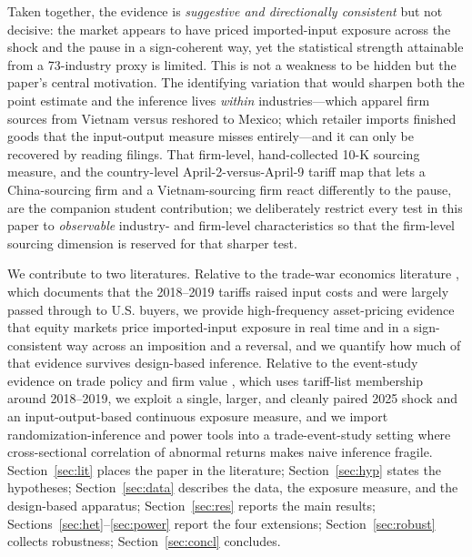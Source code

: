 \documentclass[12pt]{article}
\begin{document}
Taken together, the evidence is \emph{suggestive and directionally consistent} but not
decisive: the market appears to have priced imported-input exposure across the shock and the
pause in a sign-coherent way, yet the statistical strength attainable from a 73-industry proxy
is limited. This is not a weakness to be hidden but the paper's central motivation. The
identifying variation that would sharpen both the point estimate and the inference lives
\emph{within} industries---which apparel firm sources from Vietnam versus reshored to Mexico;
which retailer imports finished goods that the input-output measure misses entirely---and it
can only be recovered by reading filings. That firm-level, hand-collected 10-K sourcing
measure, and the country-level April-2-versus-April-9 tariff map that lets a China-sourcing
firm and a Vietnam-sourcing firm react differently to the pause, are the companion student
contribution; we deliberately restrict every test in this paper to \emph{observable}
industry- and firm-level characteristics so that the firm-level sourcing dimension is reserved
for that sharper test.

We contribute to two literatures. Relative to the trade-war economics literature
\citep{amiti2019,fajgelbaum2020,handley2017}, which documents that the 2018--2019 tariffs
raised input costs and were largely passed through to U.S. buyers, we provide
high-frequency asset-pricing evidence that equity markets price imported-input exposure in
real time and in a sign-consistent way across an imposition and a reversal, and we quantify
how much of that evidence survives design-based inference. Relative to the event-study
evidence on trade policy and firm value \citep{huang2023,amiti2020}, which uses tariff-list
membership around 2018--2019, we exploit a single, larger, and cleanly paired 2025 shock and
an input-output-based continuous exposure measure, and we import randomization-inference and
power tools \citep{young2019,abadie2020} into a trade-event-study setting where cross-sectional
correlation of abnormal returns \citep{kolari2010} makes naive inference fragile.
Section~\ref{sec:lit} places the paper in the literature; Section~\ref{sec:hyp} states the
hypotheses; Section~\ref{sec:data} describes the data, the exposure measure, and the
design-based apparatus; Section~\ref{sec:res} reports the main results;
Sections~\ref{sec:het}--\ref{sec:power} report the four extensions;
Section~\ref{sec:robust} collects robustness; Section~\ref{sec:concl} concludes.
\end{document}
